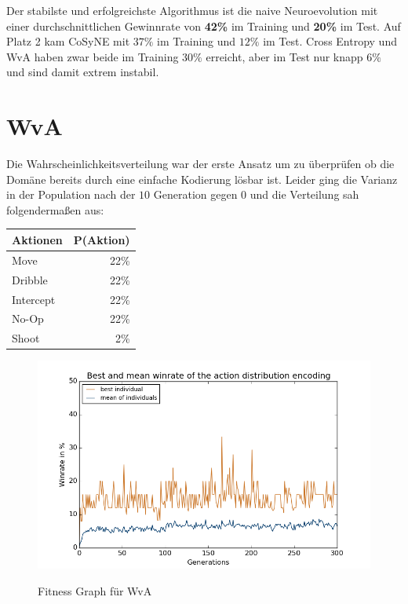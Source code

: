         \noindent
        Der stabilste und erfolgreichste Algorithmus ist die naive Neuroevolution mit einer durchschnittlichen Gewinnrate von \textbf{42\%} im Training und \textbf{20\%} im Test. Auf Platz 2 kam CoSyNE mit $37\%$ im Training und $12\%$ im Test. Cross Entropy und WvA haben zwar beide im Training $30\%$ erreicht, aber im Test nur knapp $6\%$ und sind damit extrem instabil.
\newpage
            \section{WvA}
                \begin{multicols}{2}
                    \noindent
                    Die Wahrscheinlichkeitsverteilung war der erste Ansatz um zu überprüfen ob die Domäne bereits durch eine einfache Kodierung lösbar ist. Leider ging die Varianz in der Population nach der $10$ Generation gegen $0$ und die Verteilung sah folgendermaßen aus:
                    \begin{table}[H]
                        \begin{center}
                        \begin{tabular}{ |l|r| } 
                            \hline
                            \hfill Aktionen & P(Aktion)  \\ \hline
                            Move      & 22\% \\ \hline
                            Dribble   & 22\% \\ \hline
                            Intercept & 22\% \\ \hline
                            No-Op     & 22\% \\ \hline
                            Shoot     &  2\% \\ \hline
                        \end{tabular}
                        \end{center}
                    \end{table}

                    \begin{figure}[H]
                        \centering
                        \includegraphics[scale=0.5]{../pictures/summary/actiondist-fitness.png}\\
                        \caption{Fitness Graph für WvA}\label{fig:graph-ac}
                    \end{figure}
                \end{multicols}

